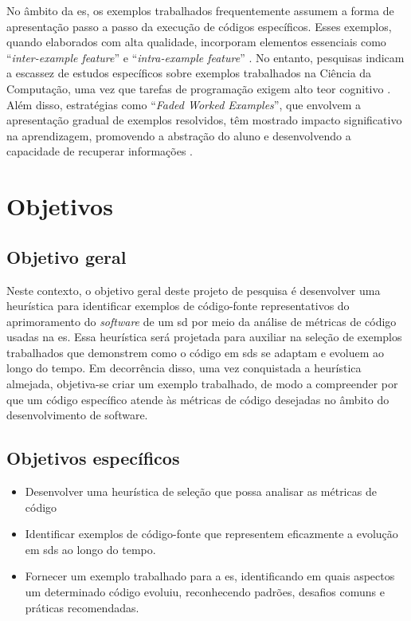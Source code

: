 No âmbito da \gls{es}, os exemplos trabalhados frequentemente assumem a forma de apresentação passo a passo da execução de códigos específicos. Esses exemplos, quando elaborados com alta qualidade, incorporam elementos essenciais como ``\textit{inter-example feature}'' e ``\textit{intra-example feature}'' \cite{Robert.Atkinson-etal:2000}. No entanto, pesquisas indicam a escassez de estudos específicos sobre exemplos trabalhados na Ciência da Computação, uma vez que tarefas de programação exigem alto teor cognitivo \cite{Skudder-LuxtonReilly:2014}. Além disso, estratégias como ``\textit{Faded Worked Examples}'', que envolvem a apresentação gradual de exemplos resolvidos, têm mostrado impacto significativo na aprendizagem, promovendo a abstração do aluno e desenvolvendo a capacidade de recuperar informações \cite{Skudder-LuxtonReilly:2014}.

\section{Objetivos}\label{sec:objetivos}
\subsection{Objetivo geral}\label{subsec:objetivoGeral}
 Neste contexto, o objetivo geral deste projeto de pesquisa é desenvolver uma heurística para identificar exemplos de código-fonte representativos do aprimoramento do \textit{software} de um \gls{sd} por meio da análise de métricas de código usadas na \gls{es}. Essa heurística será projetada para auxiliar na seleção de exemplos trabalhados que demonstrem como o código em \gls{sds} se adaptam e evoluem ao longo do tempo. Em decorrência disso, uma vez conquistada a heurística almejada, objetiva-se criar um exemplo trabalhado, de modo a compreender por que um código específico atende às métricas de código desejadas no âmbito do desenvolvimento de software.

\subsection{Objetivos específicos}\label{subsec:objetivosEspecificos}
\begin{itemize}
    \item Desenvolver uma heurística de seleção que possa analisar as métricas de código
    \item Identificar exemplos de código-fonte que representem eficazmente a evolução em \gls{sds} ao longo do tempo.
    \item Fornecer um exemplo trabalhado para a \gls{es}, identificando em quais aspectos um determinado código evoluiu, reconhecendo padrões, desafios comuns e práticas recomendadas.
\end{itemize}

